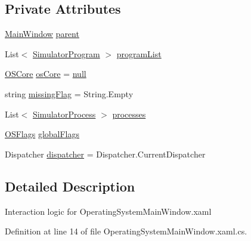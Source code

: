 \subsection*{Private Attributes}
\begin{DoxyCompactItemize}
\item 
\hyperlink{class_c_p_u___o_s___simulator_1_1_main_window}{Main\+Window} \hyperlink{class_c_p_u___o_s___simulator_1_1_operating_system_main_window_a0219ba1583d00852bea36ac27c9d878d}{parent}
\item 
List$<$ \hyperlink{class_c_p_u___o_s___simulator_1_1_c_p_u_1_1_simulator_program}{Simulator\+Program} $>$ \hyperlink{class_c_p_u___o_s___simulator_1_1_operating_system_main_window_a83bef5323931616842c44d3f8d477fd2}{program\+List}
\item 
\hyperlink{class_c_p_u___o_s___simulator_1_1_operating___system_1_1_o_s_core}{O\+S\+Core} \hyperlink{class_c_p_u___o_s___simulator_1_1_operating_system_main_window_af944b743b4780850089320d08d38b0ed}{os\+Core} = \hyperlink{_old_01_process_01_flags_8cs_afb8e110345c45e74478894341ab6b28e}{null}
\item 
string \hyperlink{class_c_p_u___o_s___simulator_1_1_operating_system_main_window_ad3dd5030de453dd97f236e7677ab6732}{missing\+Flag} = String.\+Empty
\item 
List$<$ \hyperlink{class_c_p_u___o_s___simulator_1_1_operating___system_1_1_simulator_process}{Simulator\+Process} $>$ \hyperlink{class_c_p_u___o_s___simulator_1_1_operating_system_main_window_ab6bcbc8c33ec438d2f005d4c978e1a44}{processes}
\item 
\hyperlink{struct_c_p_u___o_s___simulator_1_1_operating___system_1_1_o_s_flags}{O\+S\+Flags} \hyperlink{class_c_p_u___o_s___simulator_1_1_operating_system_main_window_a905f81a88e7878e936352f6da9ffcb93}{global\+Flags}
\item 
Dispatcher \hyperlink{class_c_p_u___o_s___simulator_1_1_operating_system_main_window_ac0f8e9dfcaba558927c53e11815fb0fb}{dispatcher} = Dispatcher.\+Current\+Dispatcher
\end{DoxyCompactItemize}


\subsection{Detailed Description}
Interaction logic for Operating\+System\+Main\+Window.\+xaml 



Definition at line 14 of file Operating\+System\+Main\+Window.\+xaml.\+cs.




